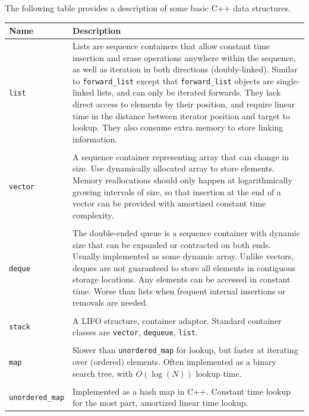 The following table provides a description of some basic C++ data structures. 

 \begin{tabular}{p{}p{}}
Name & Description \\
\hline
\texttt{list} & Lists are sequence containers that allow constant time insertion and erase operations anywhere within the sequence, as well as iteration in both directions (doubly-linked). Similar to \texttt{forward\_list} except that \texttt{forward\_list} objects are single-linked lists, and can only be iterated forwards. They lack direct access to elements by their position, and require linear time in the distance between iterator position and target to lookup. They also consume extra memory to store linking information. \\
\hfill \\
\texttt{vector} & A sequence container representing array that can change in size. Use dynamically allocated array to store elements. Memory reallocations should only happen at logarithmically growing intervals of size, so that insertion at the end of a vector can be provided with amortized constant time complexity. \\
\hfill \\
\texttt{deque} & The double-ended queue is a sequence container with dynamic size that can be expanded or contracted on both ends. Usually implemented as some dynamic array. Unlike vectors, deques are not guaranteed to store all elements in contiguous storage locations. Any elements can be accessed in constant time. Worse than lists when frequent internal insertions or removals are needed. \\
\hfill \\
\texttt{stack} & A LIFO structure, container adaptor. Standard container classes are \texttt{vector}, \texttt{dequeue}, \texttt{list}. \\
\hfill \\
\texttt{map} & Slower than \texttt{unordered\_map} for lookup, but faster at iterating over (ordered) elements. Often implemented as a binary search tree, with $O(\log(N))$ lookup time. \\
\hfill \\
\texttt{unordered\_map} & Implemented as a hash map in C++. Constant time lookup for the most part, amortized linear time lookup. \\
\end{tabular} \\


